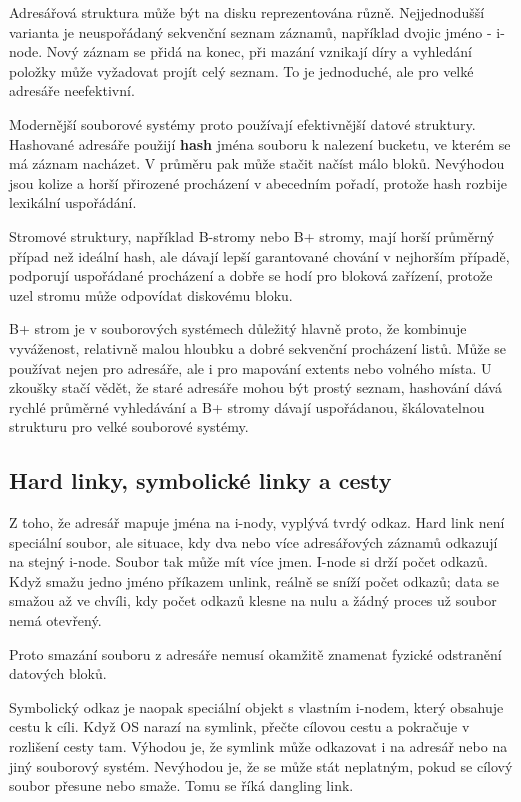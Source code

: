 \documentclass[11pt,a4paper]{article}
\begin{document}
Adresářová struktura může být na disku reprezentována různě. Nejjednodušší varianta je neuspořádaný sekvenční seznam záznamů, například dvojic jméno - i-node. Nový záznam se přidá na konec, při mazání vznikají díry a vyhledání položky může vyžadovat projít celý seznam. To je jednoduché, ale pro velké adresáře neefektivní.

Modernější souborové systémy proto používají efektivnější datové struktury. Hashované adresáře použijí \textbf{hash} jména souboru k nalezení bucketu, ve kterém se má záznam nacházet. V průměru pak může stačit načíst málo bloků. Nevýhodou jsou kolize a horší přirozené procházení v abecedním pořadí, protože hash rozbije lexikální uspořádání.

Stromové struktury, například B-stromy nebo B+ stromy, mají horší průměrný případ než ideální hash, ale dávají lepší garantované chování v nejhorším případě, podporují uspořádané procházení a dobře se hodí pro bloková zařízení, protože uzel stromu může odpovídat diskovému bloku.

B+ strom je v souborových systémech důležitý hlavně proto, že kombinuje vyváženost, relativně malou hloubku a dobré sekvenční procházení listů. Může se používat nejen pro adresáře, ale i pro mapování extents nebo volného místa. U zkoušky stačí vědět, že staré adresáře mohou být prostý seznam, hashování dává rychlé průměrné vyhledávání a B+ stromy dávají uspořádanou, škálovatelnou strukturu pro velké souborové systémy.

\subsection*{Hard linky, symbolické linky a cesty}

Z toho, že adresář mapuje jména na i-nody, vyplývá tvrdý odkaz. Hard link není speciální soubor, ale situace, kdy dva nebo více adresářových záznamů odkazují na stejný i-node. Soubor tak může mít více jmen. I-node si drží počet odkazů. Když smažu jedno jméno příkazem unlink, reálně se sníží počet odkazů; data se smažou až ve chvíli, kdy počet odkazů klesne na nulu a žádný proces už soubor nemá otevřený.

Proto smazání souboru z adresáře nemusí okamžitě znamenat fyzické odstranění datových bloků.

Symbolický odkaz je naopak speciální objekt s vlastním i-nodem, který obsahuje cestu k cíli. Když OS narazí na symlink, přečte cílovou cestu a pokračuje v rozlišení cesty tam. Výhodou je, že symlink může odkazovat i na adresář nebo na jiný souborový systém. Nevýhodou je, že se může stát neplatným, pokud se cílový soubor přesune nebo smaže. Tomu se říká dangling link.
\end{document}
